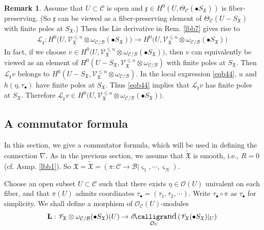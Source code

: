\documentclass[11pt,b5paper,notitlepage]{article}
\theoremstyle{definition}
\newtheorem{rem}[df]{Remark}
\theoremstyle{plain}
\newcommand{\fk}{\mathfrak}
\newcommand{\mc}{\mathcal}
\newcommand{\wtd}{\widetilde}
\newcommand{\Lbf}{\mathbf{L}}
\newcommand{\ML}{\mathcal{L}}
\newcommand{\SV}{\mathscr{V}}
\newcommand{\xk}{\mathfrak x}
\newcommand{\sgm}{\varsigma}
\newcommand{\SX}{{S_{\fk X}}}
\newcommand{\blt}{\bullet}
\newcommand{\<}{\left\langle}
\renewcommand{\>}{\right\rangle}
\newcommand{\MO}{\mathcal{O}}
\newcommand{\MC}{\mathcal{C}}
\newcommand{\MB}{\mathcal{B}}
\newcommand{\fx}{\mathfrak{X}}
\DeclareMathOperator{\send}{\mathscr{E}\text{\kern -3pt {\calligra\large nd}}\,}
\numberwithin{equation}{subsection}
\begin{document}
\begin{rem}\label{lieder1}
Assume that $U\subset \mc C$ is open and $\xk\in H^0(U,\Theta_\MC(\blt\SX))$ is fiber-preserving. (So $\xk$ can be viewed as a fiber-preserving element of $\Theta_\MC(U-\SX)$ with finite poles at $\SX$.) Then the Lie derivative in Rem. \ref{lbb7} gives rise to
\begin{align}\label{eqb26}
    \ML_\xk:H^0\big(U,\SV_\fx^{\leq n}\otimes \omega_{\MC/\MB}(\blt S_\fx)\big)\rightarrow H^0\big(U,\SV_\fx^{\leq n}\otimes \omega_{\MC/\MB}(\blt S_\fx)\big)
\end{align}
In fact, if we choose $v\in H^0\big(U,\SV_\fx^{\leq n}\otimes \omega_{\MC/\MB}(\blt S_\fx)\big)$, then $v$ can equivalently be viewed as an element of $H^0(U-\SX,\SV_\fx^{\leq n}\otimes \omega_{\MC/\MB})$ with finite poles at $\SX$. Then $\mc L_\xk v$ belongs to  $H^0(U-\SX,\SV_\fx^{\leq n}\otimes \omega_{\MC/\MB})$. In the local expression \eqref{eqb44}, $u$ and $h(\eta,\tau_\blt)$ have finite poles at $\SX$. Thus \eqref{eqb44} implies that $\mc L_\xk v$ has finite poles at $\SX$. Therefore $\mc L_\xk v\in H^0\big(U,\SV_\fx^{\leq n}\otimes \omega_{\MC/\MB}(\blt S_\fx)\big)$.
\end{rem}




\subsection{A commutator formula}
In this section, we give a commutator formula, which will be used in defining the connection $\nabla$. As in the previous section, we assume that $\wtd{\fk X}$ is smooth, i.e., $R=0$ (cf. Asmp. \ref{lbb1}). So  $\fx=\wtd{\fx}=(\pi:\MC\rightarrow\MB\big| \sgm_1,\cdots,\sgm_N)$. 

Choose an open subset $U\subset \MC$ such that there exists $\eta\in\mc O(U)$ univalent on each fiber, and that $\pi(U)$ admits coordinates $\tau_\blt=(\tau_1,\tau_2,\cdots)$. Write $\tau_\blt\circ \pi$ as $\tau_\blt$ for simplicity.   We shall define a morphism of $\MO_\MC(U)$-modules
\begin{align}\label{commutator1}
    \Lbf:\SV_\fx\otimes \omega_{\MC/\MB}(\blt S_\fx)(U)\rightarrow\send_{\MO_U}(\SV_\fx(\bullet S_{\mathfrak{X}})\vert_U)
\end{align}
\end{document}
